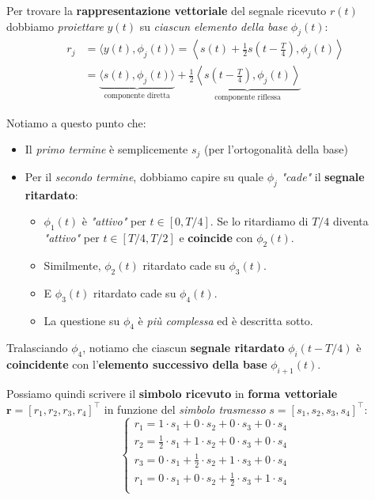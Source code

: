 Per trovare la \textbf{rappresentazione vettoriale} del segnale ricevuto $r(t)$
dobbiamo \textit{proiettare} $y(t)$ su \textit{ciascun elemento della base} $\phi_j(t)$:
\[
    \begin{aligned}
        r_j &= \langle y(t), \phi_j(t) \rangle = 
              \left\langle s(t) + \frac{1}{2}s\left( t - \frac{T}{4} \right), \phi_j (t) \right\rangle \\ 
            &= \underbrace{ \langle s(t), \phi_j(t) \rangle }_{\text{componente diretta}}
            + \frac{1}{2}\underbrace{\left\langle s \left( t - \frac{T}{4} \right), \phi_j(t) \right\rangle}_{
            \text{componente riflessa}}
    \end{aligned}
\]

Notiamo a questo punto che:
\begin{itemize}
    \item Il \textit{primo termine} è semplicemente $s_j$ (per l'ortogonalità della base)
    \item Per il \textit{secondo termine}, dobbiamo capire su quale $\phi_j$ \textit{"cade"}
        il \textbf{segnale ritardato}:
        \begin{itemize}
            \item $\phi_{1}(t)$ è \textit{"attivo"} per $t\in [0, T/4]$. Se lo ritardiamo
                di $T/4$ diventa \textit{"attivo"} per $t\in[T/4, T/2]$ e
                \textbf{coincide} con $\phi_{2}(t)$.
            \item Similmente, $\phi_{2}(t)$ ritardato cade su $\phi_{3}(t)$.
            \item E $\phi_{3}(t)$ ritardato cade su $\phi_{4}(t)$.
            \item La questione su $\phi_{4}$ è \textit{più complessa} ed
                è descritta sotto.
        \end{itemize}
\end{itemize}

Tralasciando $\phi_{4}$, notiamo che ciascun \textbf{segnale ritardato} $\phi_i(t - T/4)$ è
\textbf{coincidente} con l'\textbf{elemento successivo della base} $\phi_{i+1}(t)$.

Possiamo quindi scrivere il \textbf{simbolo ricevuto} in \textbf{forma vettoriale}
$\mathbf{r} = [ r_{1}, r_{2}, r_{3}, r_{4} ]^\top $ in funzione 
del \textit{simbolo trasmesso} $s = [s_{1}, s_{2}, s_{3}, s_{4}]^\top$:
\[
    \begin{cases}
        r_{1} = 1\cdot s_{1} + 0\cdot s_{2} + 0\cdot s_{3} + 0\cdot s_{4} \\
        r_{2} = \frac{1}{2}\cdot s_{1} + 1\cdot s_{2} + 0\cdot s_{3} + 0\cdot s_{4} \\
        r_{3} = 0\cdot s_{1} + \frac{1}{2}\cdot s_{2} + 1\cdot s_{3} + 0\cdot s_{4} \\
        r_{1} = 0\cdot s_{1} + 0\cdot s_{2} + \frac{1}{2}\cdot s_{3} + 1\cdot s_{4} \\
    \end{cases}
\]

